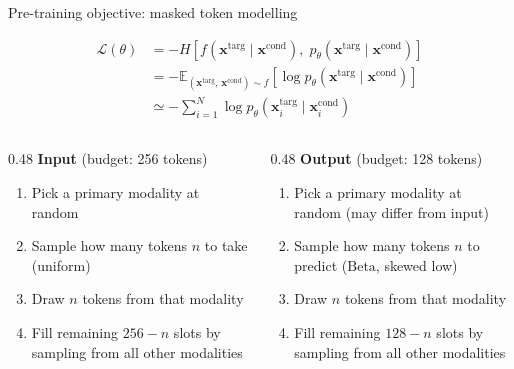 \documentclass[10pt]{beamer}
\begin{document}
\begin{frame}{Pre-training objective: masked token modelling}
  \begin{center}
    \begin{align*}
      \mathcal{L}(\theta)
      &= -H\!\left[f(\mathbf{x}^{\mathrm{targ}} \mid \mathbf{x}^{\mathrm{cond}}),\; p_\theta(\mathbf{x}^{\mathrm{targ}} \mid \mathbf{x}^{\mathrm{cond}})\right] \\
      &= -\mathbb{E}_{(\mathbf{x}^{\mathrm{targ}},\,\mathbf{x}^{\mathrm{cond}})\sim f}
          \!\left[\log p_\theta(\mathbf{x}^{\mathrm{targ}} \mid \mathbf{x}^{\mathrm{cond}})\right] \\
      &\simeq -\sum_{i=1}^{N} \log p_\theta\!\left(\mathbf{x}_i^{\mathrm{targ}} \mid \mathbf{x}_i^{\mathrm{cond}}\right)
    \end{align*}
  \end{center}
  \vspace{0.4em}
  \begin{columns}[T]
    \begin{column}{0.48\textwidth}
      \textbf{Input} (budget: 256 tokens)
      \begin{enumerate}\small
        \item Pick a primary modality at random
        \item Sample how many tokens $n$ to take (uniform)
        \item Draw $n$ tokens from that modality
        \item Fill remaining $256-n$ slots by sampling from all other modalities
      \end{enumerate}
    \end{column}
    \begin{column}{0.48\textwidth}
      \textbf{Output} (budget: 128 tokens)
      \begin{enumerate}\small
        \item Pick a primary modality at random (may differ from input)
        \item Sample how many tokens $n$ to predict ($\mathrm{Beta}$, skewed low)
        \item Draw $n$ tokens from that modality
        \item Fill remaining $128-n$ slots by sampling from all other modalities
      \end{enumerate}
    \end{column}
  \end{columns}
\end{frame}
\end{document}
